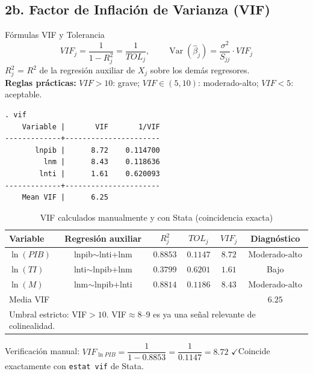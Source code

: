 \documentclass[12pt,a4paper]{article}
\newcommand\Var{\operatorname{Var}}
\begin{document}
\subsection{2b. Factor de Inflación de Varianza (VIF)}

\begin{frmbox}{Fórmulas VIF y Tolerancia}
\[VIF_j = \frac{1}{1-R_j^2} = \frac{1}{TOL_j},
\qquad\Var(\hat\beta_j)=\frac{\sigma^2}{S_{jj}}\cdot VIF_j\]
$R_j^2$ = $R^2$ de la regresión auxiliar de $X_j$ sobre los demás regresores.\\
\textbf{Reglas prácticas:} $VIF>10$: grave; $VIF\in(5,10)$: moderado-alto; $VIF<5$: aceptable.
\end{frmbox}

\begin{statabox}
\begin{lstlisting}[style=Stata]
. vif
    Variable |       VIF       1/VIF
-------------+----------------------
       lnpib |      8.72    0.114700
         lnm |      8.43    0.118636
        lnti |      1.61    0.620093
-------------+----------------------
    Mean VIF |      6.25
\end{lstlisting}
\end{statabox}

\begin{table}[H]\centering
\caption{VIF calculados manualmente y con Stata (coincidencia exacta)}
\begin{tabular}{lccccc}
\toprule
\textbf{Variable} & \textbf{Regresión auxiliar} & $R_j^2$ & $TOL_j$ & $VIF_j$ & \textbf{Diagnóstico}\\
\midrule
\rowcolor{naranja!15}$\ln(PIB)$ & lnpib$\sim$lnti+lnm & $0.8853$ & $0.1147$ & $8.72$ & Moderado-alto\\
$\ln(TI)$ & lnti$\sim$lnpib+lnm & $0.3799$ & $0.6201$ & $1.61$ & \textcolor{verde_o}{Bajo}\\
\rowcolor{naranja!15}$\ln(M)$ & lnm$\sim$lnpib+lnti & $0.8814$ & $0.1186$ & $8.43$ & Moderado-alto\\
\midrule
\multicolumn{5}{l}{Media VIF} & $6.25$\\
\bottomrule
\multicolumn{6}{l}{\footnotesize Umbral estricto: VIF$>10$. VIF$\approx8$--9 es ya una señal relevante de colinealidad.}
\end{tabular}
\end{table}

\begin{notabox}
Verificación manual: $VIF_{\ln PIB}=\dfrac{1}{1-0.8853}=\dfrac{1}{0.1147}=\mathbf{8.72}$
\quad$\checkmark$\quad Coincide exactamente con \texttt{estat vif} de Stata.
\end{notabox}
\end{document}
